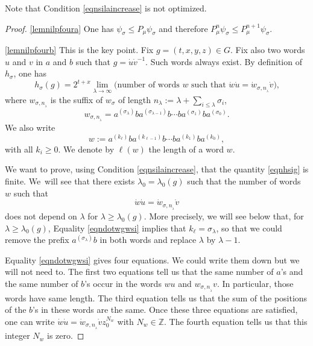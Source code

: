 \documentclass[JEP,XML,SOM,Unicode]{cedram}
\theoremstyle{definition}
\newcommand{\m}[1]{\mathbb{ #1}}
\let\la\lambda
\let\si\sigma
\begin{document}
Note that Condition \eqref{eqnsilaincrease} is not optimized.

\skpt
\begin{proof}
\eqref{lemnilpfoura} One has $\psi_\si\leq P_\mu\psi_\si$ and therefore $P_\mu^n\psi_\si\leq P_\mu^{n+1}\psi_\si$.

\eqref{lemnilpfourb} This is the key point.
Fix $g=(t,x,y,z)\in G$.
Fix also two words $u$ and $v$ in $a$ and $b$
such that $g=\dot{u}\dot{v}^{-1}$. Such words always exist.
By definition of $h_\si$, one has
\begin{equation}
\label{eqnhsig}
h_{\si}(g)=2^{t+x} \lim_{\la\to\infty}
\text{(number of words $w$ such that $\dot{w}\dot{u}=\dot{w}_{\si,n_{_\la}}\dot{v}$),}
\end{equation}
where $w_{\si,n_{_\la}}$ is the suffix of $w_\si$
of length $n_\la:= \la+\sum_{ i\leq \la} \si_i$, \ie
\begin{equation}
\label{eqnwordwsi}
w_{\si,n_{_\la}} = a^{(\si_{\la})}ba^{(\si_{\la-1})}b\cdots ba^{(\si_1)}ba^{(\si_0)}.
\end{equation}
We also write
\begin{equation}
\label{eqnwordw}
w:= a^{(k_{\ell})}ba^{(k_{\ell-1})}b\cdots ba^{(k_1)}ba^{(k_0)},
\end{equation}
with all $k_i\geq 0$. We denote by $\ell(w)$ the length of a word $w$.

We want to prove, using Condition \eqref{eqnsilaincrease}, that the quantity \eqref{eqnhsig} is finite.
We~will see that there exists $\la_0=\la_0(g)$ such that
the number of words $w$ such that
\begin{equation}
\label{eqndotwgwsi}
\dot{w}\dot{u}=\dot{w}_{\si,n_{_\la}}\dot{v}
\end{equation}
does not depend on $\la$ for $\la\geq \la_0(g)$.
More precisely, we will see below that,
for $\la\geq \la_0(g)$,
Equality \eqref{eqndotwgwsi} implies
that $k_\ell=\si_{\la}$, so that we could remove the prefix $a^{(\si_\la)}b$
in both words and replace $\la$ by $\la\! -\! 1$.

Equality \eqref{eqndotwgwsi} gives four equations.
We could write them down but we will not need to.
The first two equations tell us that the same number of $a$'s and the same number of $b$'s
occur in the words $wu$ and $w_{\si,n_{_\la}}v$. In particular, those words have same length.
The third equation tells us that the sum of the positions of the $b$'s in these words
are the same.
Once these three equations are satisfied, one can write
$\dot{w}\dot{u}=\dot{w}_{\si,n_{_\la}}\dot{v} z_0^{N_w}$
with $N_w\in \m Z$.
The fourth equation
tells us that this integer $N_w$ is zero.


\end{proof}
\end{document}
